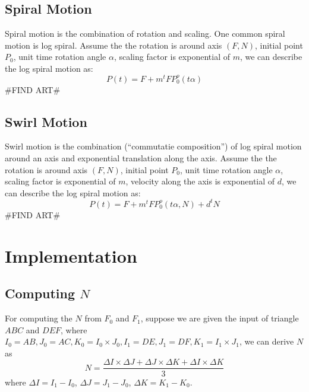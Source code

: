 \documentclass[twoside,11pt]{article}
\begin{document}
\subsection{Spiral Motion}
Spiral motion is the combination of rotation and scaling. One common spiral motion is log spiral. Assume the the rotation is around axis $(F, N)$, initial point $P_0$, unit time rotation angle $\alpha$, scaling factor is exponential of $m$, we can describe the log spiral motion as:
\begin{equation}
P(t) = F + m^t FP_0^o(t\alpha)
\end{equation}
\#FIND ART\#

\subsection{Swirl Motion}
Swirl motion is the combination (``commutatie composition'') of log spiral motion around an axis and exponential translation along the axis. Assume the the rotation is around axis $(F, N)$, initial point $P_0$, unit time rotation angle $\alpha$, scaling factor is exponential of $m$, velocity along the axis is exponential of $d$, we can describe the log spiral motion as:
\begin{equation}
P(t) = F + m^t FP_0^o(t\alpha, N) + d^t N
\end{equation}
\#FIND ART\#

\section{Implementation}


\subsection{Computing $N$}

For computing the $N$ from $F_0$ and $F_1$, suppose we are given the input of triangle $ABC$ and $DEF$, where $I_0 = AB, J_0 = AC, K_0 = I_0 \times J_0, I_1 = DE, J_1 = DF, K_1 =  I_1 \times J_1$, we can derive $N$ as
\begin{equation}
N = \frac{\Delta I \times \Delta J + \Delta J \times \Delta K + \Delta I \times \Delta K}{3}
\end{equation}
where $\Delta I = I_1 - I_0$, $\Delta J = J_1 - J_0$, $\Delta K = K_1 - K_0$.
\end{document}
